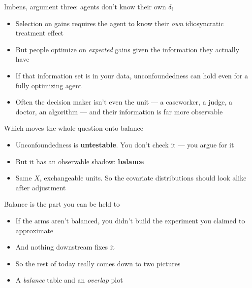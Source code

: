 \documentclass{beamer}
\newcommand{\highlight}[1]{\textcolor{accent}{\textbf{#1}}}
\begin{document}
\begin{frame}{Imbens, argument three: agents don't know their own $\delta_i$}

\begin{itemize}
\item Selection on gains requires the agent to know their \emph{own} idiosyncratic treatment effect
\item But people optimize on \emph{expected} gains given the information they actually have
\end{itemize}

\vspace{0.8em}

\begin{itemize}
\item If that information set is in your data, unconfoundedness can hold even for a fully optimizing agent
\item Often the decision maker isn't even the unit --- a caseworker, a judge, a doctor, an algorithm --- and their information is far more observable
\end{itemize}

\end{frame}


\begin{frame}{Which moves the whole question onto balance}

\begin{itemize}
\item Unconfoundedness is \highlight{untestable}. You don't check it --- you argue for it
\item But it has an observable shadow: \highlight{balance}
\item Same $X$, exchangeable units. So the covariate distributions should look alike after adjustment
\end{itemize}

\end{frame}


\begin{frame}{Balance is the part you can be held to}

\begin{itemize}
\item If the arms aren't balanced, you didn't build the experiment you claimed to approximate
\item And nothing downstream fixes it
\item So the rest of today really comes down to two pictures
\item A \emph{balance} table and an \emph{overlap} plot
\end{itemize}

\end{frame}
\end{document}
